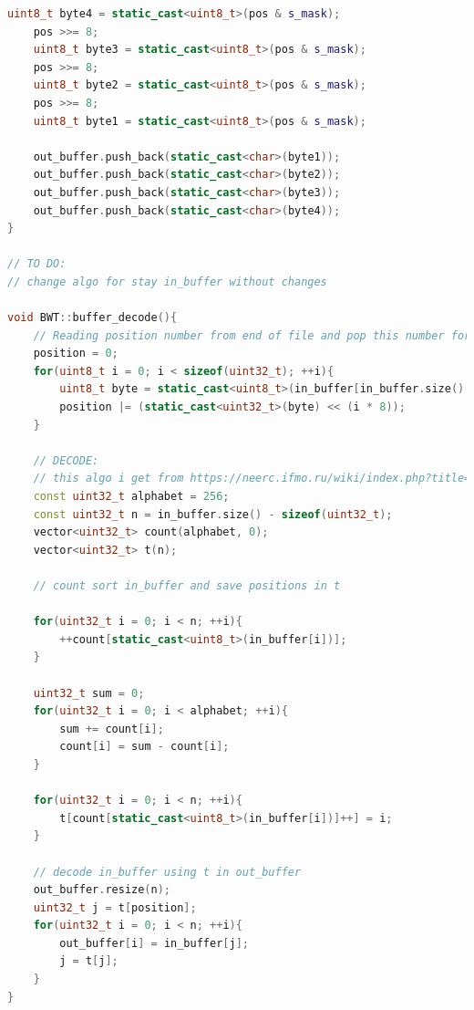\begin{lstlisting}[language=C++]
    uint8_t byte4 = static_cast<uint8_t>(pos & s_mask);
    pos >>= 8;
    uint8_t byte3 = static_cast<uint8_t>(pos & s_mask);
    pos >>= 8;
    uint8_t byte2 = static_cast<uint8_t>(pos & s_mask);
    pos >>= 8;
    uint8_t byte1 = static_cast<uint8_t>(pos & s_mask);

    out_buffer.push_back(static_cast<char>(byte1));
    out_buffer.push_back(static_cast<char>(byte2));
    out_buffer.push_back(static_cast<char>(byte3));
    out_buffer.push_back(static_cast<char>(byte4));
}

// TO DO:
// change algo for stay in_buffer without changes

void BWT::buffer_decode(){
    // Reading position number from end of file and pop this number for stay in_buffer as string for decode
    position = 0;
    for(uint8_t i = 0; i < sizeof(uint32_t); ++i){
        uint8_t byte = static_cast<uint8_t>(in_buffer[in_buffer.size() - 1 - i]);
        position |= (static_cast<uint32_t>(byte) << (i * 8));
    }

    // DECODE:
    // this algo i get from https://neerc.ifmo.ru/wiki/index.php?title=Преобразование_Барроуза-Уилера
    const uint32_t alphabet = 256;
    const uint32_t n = in_buffer.size() - sizeof(uint32_t);
    vector<uint32_t> count(alphabet, 0);
    vector<uint32_t> t(n);

    // count sort in_buffer and save positions in t

    for(uint32_t i = 0; i < n; ++i){
        ++count[static_cast<uint8_t>(in_buffer[i])];
    }

    uint32_t sum = 0;
    for(uint32_t i = 0; i < alphabet; ++i){
        sum += count[i];
        count[i] = sum - count[i];
    }

    for(uint32_t i = 0; i < n; ++i){
        t[count[static_cast<uint8_t>(in_buffer[i])]++] = i;
    }

    // decode in_buffer using t in out_buffer
    out_buffer.resize(n);
    uint32_t j = t[position];
    for(uint32_t i = 0; i < n; ++i){
        out_buffer[i] = in_buffer[j];
        j = t[j];
    }
}
\end{lstlisting}


